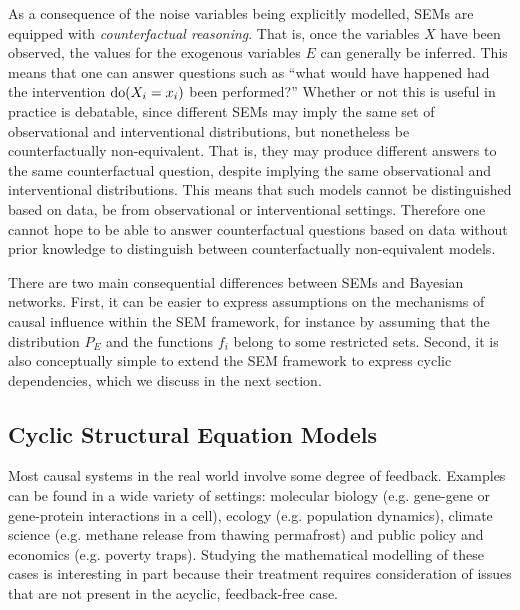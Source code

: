 As a consequence of the noise variables being explicitly modelled, SEMs are equipped with \emph{counterfactual reasoning}. 
That is, once the variables $X$ have been observed, the values for the exogenous variables $E$ can generally be inferred. 
This means that one can answer questions such as ``what would have happened had the intervention $\operatorname{do}(X_i=x_i)$ been performed?''
Whether or not this is useful in practice is debatable, since different SEMs may imply the same set of observational and interventional distributions, but nonetheless be counterfactually non-equivalent. That is, they may produce different answers to the same counterfactual question, despite implying the same observational and interventional distributions. This means that such models cannot be distinguished based on data, be from observational or interventional settings. Therefore one cannot hope to be able to answer counterfactual questions based 
on data without prior knowledge to distinguish between counterfactually non-equivalent models.


There are two main consequential differences between SEMs and Bayesian networks.
First, it can be easier to express assumptions on the mechanisms of causal influence within the SEM framework, for instance by assuming that the distribution $P_E$ and the functions $f_i$ belong to some restricted sets.
Second, it is also conceptually simple to extend the SEM framework to express cyclic dependencies, which we discuss in the next section.



\subsection{Cyclic Structural Equation Models}

Most causal systems in the real world involve some degree of feedback. 
Examples can be found in a wide variety of settings: molecular biology (e.g. gene-gene or gene-protein interactions in a cell), ecology (e.g. population dynamics), climate science (e.g. methane release from thawing permafrost) and public policy and economics (e.g. poverty traps).
Studying the mathematical modelling of these cases is interesting in part because their treatment requires consideration of issues that are not present in the acyclic, feedback-free case.

